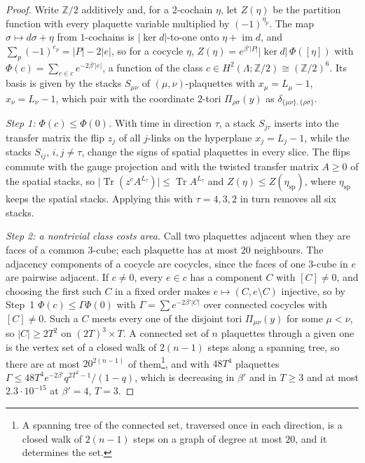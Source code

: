 \documentclass[11pt,a4paper]{amsart}
\theoremstyle{definition}
\theoremstyle{remark}
\numberwithin{equation}{section}
\DeclareMathOperator{\Tr}{Tr}        %
\newcommand{\Z}{\mathbb{Z}}          %
\newcommand{\abs}[1]{\lvert #1\rvert}      %
\newcommand{\cube}[1]{(2#1)^3}             %
\begin{document}
\begin{proof}
Write $\Z/2$ additively and, for a $2$-cochain $\eta$, let $Z(\eta)$ be the partition function with every plaquette variable multiplied by $(-1)^{\eta_p}$. The map $\sigma\mapsto d\sigma+\eta$ from $1$-cochains is $\abs{\ker d}$-to-one onto $\eta+\operatorname{im}d$, and $\sum_p(-1)^{e_p}=\abs P-2\abs e$, so for a cocycle $\eta$, $Z(\eta)=e^{\beta'\abs P}\abs{\ker d}\,\Phi([\eta])$ with $\Phi(c)=\sum_{e\in c}e^{-2\beta'\abs e}$, a function of the class $c\in H^2(\Lambda;\Z/2)\cong(\Z/2)^6$. Its basis is given by the stacks $S_{\mu\nu}$ of $(\mu,\nu)$-plaquettes with $x_\mu=L_\mu-1$, $x_\nu=L_\nu-1$, which pair with the coordinate $2$-tori $\Pi_{\rho\sigma}(y)$ as $\delta_{\{\mu\nu\},\{\rho\sigma\}}$.

\emph{Step 1: $\Phi(c)\le\Phi(0)$.} With time in direction $\tau$, a stack $S_{j\tau}$ inserts into the transfer matrix the flip $z_j$ of all $j$-links on the hyperplane $x_j=L_j-1$, while the stacks $S_{ij}$, $i,j\ne\tau$, change the signs of spatial plaquettes in every slice. The flips commute with the gauge projection and with the twisted transfer matrix $A\ge0$ of the spatial stacks, so $\abs{\Tr(z^cA^{L_\tau})}\le\Tr A^{L_\tau}$ and $Z(\eta)\le Z(\eta_{\mathrm{sp}})$, where $\eta_{\mathrm{sp}}$ keeps the spatial stacks. Applying this with $\tau=4,3,2$ in turn removes all six stacks.

\emph{Step 2: a nontrivial class costs area.} Call two plaquettes adjacent when they are faces of a common $3$-cube; each plaquette has at most $20$ neighbours. The adjacency components of a cocycle are cocycles, since the faces of one $3$-cube in $e$ are pairwise adjacent. If $c\ne0$, every $e\in c$ has a component $C$ with $[C]\ne0$, and choosing the first such $C$ in a fixed order makes $e\mapsto(C,e\setminus C)$ injective, so by Step~1 $\Phi(c)\le\Gamma\Phi(0)$ with $\Gamma=\sum e^{-2\beta'\abs C}$ over connected cocycles with $[C]\ne0$. Such a $C$ meets every one of the disjoint tori $\Pi_{\mu\nu}(y)$ for some $\mu<\nu$, so $\abs C\ge2T^2$ on $\cube T\times T$. A connected set of $n$ plaquettes through a given one is the vertex set of a closed walk of $2(n-1)$ steps along a spanning tree, so there are at most $20^{2(n-1)}$ of them\footnote{A spanning tree of the connected set, traversed once in each direction, is a closed walk of $2(n-1)$ steps on a graph of degree at most $20$, and it determines the set.}, and with $48T^4$ plaquettes $\Gamma\le48T^4e^{-2\beta'}q^{2T^2-1}/(1-q)$, which is decreasing in $\beta'$ and in $T\ge3$ and at most $2.3\cdot10^{-15}$ at $\beta'=4$, $T=3$.


\end{proof}
\end{document}
